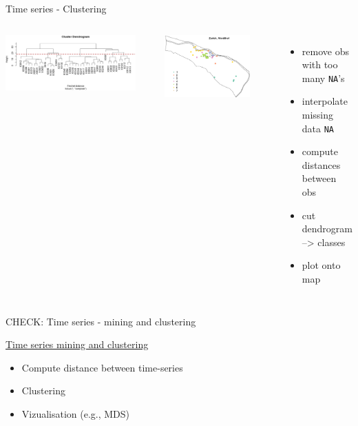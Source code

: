\documentclass[8pt,ignorenonframetext,]{beamer}
\providecommand{\tightlist}{%
  \setlength{\itemsep}{0pt}\setlength{\parskip}{0pt}}
\newcommand{\columnsbegin}{\begin{columns}}
\newcommand{\columnsend}{\end{columns}}
\begin{document}
\begin{frame}[fragile]{Time series - Clustering}

\columnsbegin
{}

\includegraphics[width=0.90000\textwidth]{imgPres/ts_cluster_dendo.png}

\includegraphics[width=0.80000\textwidth]{imgPres/ts_cluster_map.png}

\begin{itemize}
\tightlist
\item
  remove obs with too many \texttt{NA}'s
\item
  interpolate missing data \texttt{NA}
\item
  compute distances between obs
\item
  cut dendrogram --\textgreater{} classes
\item
  plot onto map
\end{itemize}

\columnsend

\end{frame}

\begin{frame}{CHECK: Time series - mining and clustering}

\href{https://rdatamining.wordpress.com/2011/08/23/time-series-analysis-and-mining-with-r/}{Time
series mining and clustering}

\begin{itemize}
\tightlist
\item
  Compute distance between time-series
\item
  Clustering
\item
  Vizualisation (e.g., MDS)
\end{itemize}

\end{frame}
\end{document}
